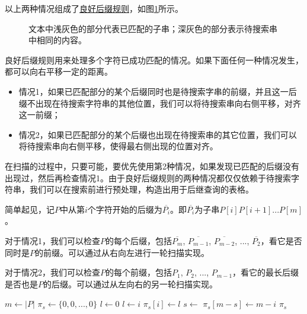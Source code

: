 \documentclass[UTF8]{article}
\begin{document}
以上两种情况组成了\underline{良好后缀规则}，如图\ref{fig:good-suffix-cases}所示。

\begin{figure}[htbp]
 \centering
  \hspace{.01\textwidth}
 \caption{文本中浅灰色的部分代表已匹配的子串；深灰色的部分表示待搜索串中相同的内容。}
 \label{fig:good-suffix-cases}
\end{figure}

良好后缀规则用来处理多个字符已成功匹配的情况。如果下面任何一种情况发生，都可以向右平移一定的距离。

\begin{itemize}
\item 情况1，如果已匹配部分的某个后缀同时也是待搜索字串的前缀，并且这一后缀不出现在待搜索字符串的其他位置，我们可以将待搜索串向右侧平移，对齐这一前缀；
\item 情况2，如果已匹配部分的某个后缀也出现在待搜索串的其它位置，我们可以将待搜索串向右侧平移，使得最右侧出现的位置对齐。
\end{itemize}

在扫描的过程中，只要可能，要优先使用第2种情况，如果发现已匹配的后缀没有出现过，然后再检查情况1。由于良好后缀规则的两种情况都仅仅依赖于待搜索字符串，我们可以在搜索前进行预处理，构造出用于后继查询的表格。

简单起见，记$P$中从第$i$个字符开始的后缀为$\overline{P_i}$。即$\overline{P_i}$为子串$P[i]P[i+1]...P[m]$。

对于情况1，我们可以检查$P$的每个后缀，包括$\overline{P_m}$, $\overline{P_{m-1}}$, $\overline{P_{m-2}}$, ...,  $\overline{P_2}$，看它是否同时是$P$的前缀。可以通过从右向左进行一轮扫描实现。

对于情况2，我们可以检查$P$的每个前缀，包括$P_1$, $P_2$, ..., $P_{m-1}$，看它的最长后缀是否也是$P$的后缀。可以通过从左向右的另一轮扫描实现。

\begin{algorithmic}[1]
  \State $m \gets |P|$
  \State $\pi_s \gets \{0, 0, ..., 0\}$ 
  \State $l \gets 0$ 
   
     
      \State $l \gets i$
    \EndIf
    \State $\pi_s[i] \gets l$
  \EndFor
   
    \State $s \gets$ 
      \State $\pi_s[m - s] \gets m - i$
    \EndIf
  \EndFor
  \State \Return $\pi_s$
\EndFunction
\end{algorithmic}
\end{document}
